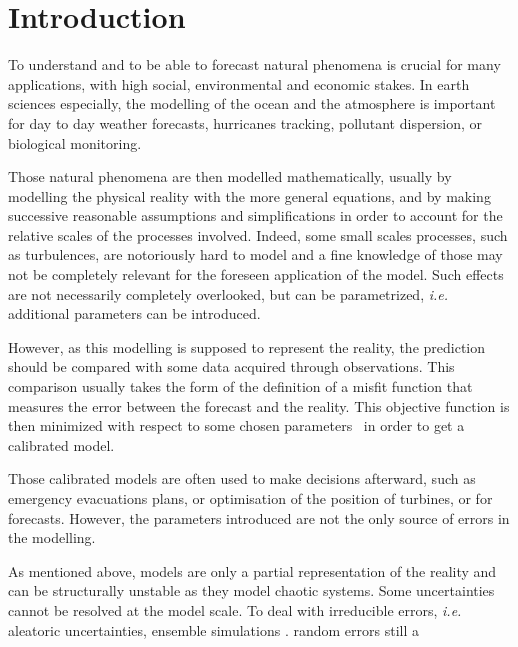 \documentclass[../../Main_ManuscritThese.tex]{subfiles}
\begin{document}
\pagestyle{introStyle}
\chapter*{Introduction}
\TitleBtwLines

{}
\label{chap:Introduction}





To understand and to be able to forecast natural phenomena is crucial
for many applications, with high social, environmental and economic
stakes.  In earth sciences especially, the modelling of the ocean and
the atmosphere is important for day to day weather forecasts,
hurricanes tracking, pollutant dispersion, or biological monitoring.

Those natural phenomena are then modelled mathematically, usually by
modelling the physical reality with the more general equations, and by
making successive reasonable assumptions and simplifications in order
to account for the relative scales of the processes involved. Indeed,
some small scales processes, such as turbulences, are notoriously hard
to model and a fine knowledge of those may not be completely relevant
for the foreseen application of the model. Such effects are not
necessarily completely overlooked, but can be parametrized, \textit{i.e.}
additional parameters can be introduced.

However, as this modelling is supposed to represent the reality, the
prediction should be compared with some data acquired through
observations. This comparison usually takes the form of the definition
of a misfit function that measures the error between the forecast and
the reality. This objective function is then minimized with respect to
some chosen
parameters~\cite{das_estimation_1991,das_variational_1992,boutet_estimation_2015}
in order to get a calibrated model.

Those calibrated models are often used to make decisions afterward,
such as emergency evacuations plans, or optimisation of the position
of turbines, or for forecasts. However, the parameters introduced are
not the only source of errors in the modelling.

As mentioned above, models are only a partial representation of the
reality and can be structurally unstable as they model chaotic
systems. Some uncertainties cannot be resolved at the model scale.
To deal with irreducible errors, \emph{i.e.} aleatoric uncertainties, ensemble simulations \cite{mcwilliams_irreducible_2007}. random errors still a \cite{zanna_ocean_2011}
\end{document}
